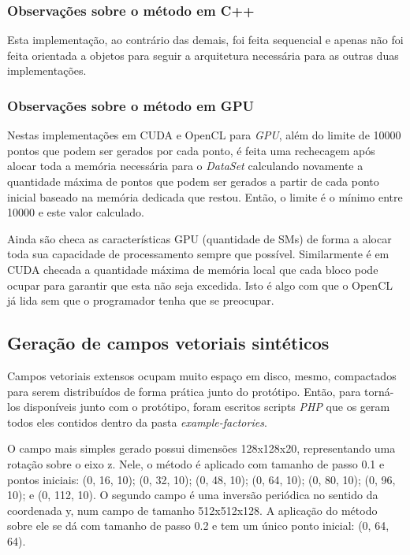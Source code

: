     \subsubsection{Observações sobre o método em C++}
    Esta implementação, ao contrário das demais, foi feita sequencial e apenas não foi feita orientada a objetos para seguir a arquitetura necessária para as outras duas implementações.
    
    \subsubsection{Observações sobre o método em GPU}
    Nestas implementações em CUDA e OpenCL para \textit{GPU}, além do limite de 10000 pontos que podem ser gerados por cada ponto, é feita uma rechecagem após alocar toda a memória necessária para o \textit{DataSet} calculando novamente a quantidade máxima de pontos que podem ser gerados a partir de cada ponto inicial baseado na memória dedicada que restou. Então, o limite é o mínimo entre 10000 e este valor calculado.

    Ainda são checa as características GPU (quantidade de SMs) de forma a alocar toda sua capacidade de processamento sempre que possível. Similarmente é em CUDA checada a quantidade máxima de memória local que cada bloco pode ocupar para garantir que esta não seja excedida. Isto é algo com que o OpenCL já lida sem que o programador tenha que se preocupar.
     
  \subsection{Geração de campos vetoriais sintéticos}
  Campos vetoriais extensos ocupam muito espaço em disco, mesmo, compactados para serem distribuídos de forma prática junto do protótipo. Então, para torná-los disponíveis junto com o protótipo, foram escritos scripts \textit{PHP} que os geram todos eles contidos dentro da pasta \textit{example-factories}.
  
  O campo mais simples gerado possui dimensões 128x128x20, representando uma rotação sobre o eixo z. Nele, o método é aplicado com tamanho de passo 0.1 e pontos iniciais: (0, 16, 10); (0, 32, 10); (0, 48, 10); (0, 64, 10); (0, 80, 10); (0, 96, 10); e  (0, 112, 10). O segundo campo é uma inversão periódica no sentido da coordenada y, num campo de tamanho 512x512x128. A aplicação do método sobre ele se dá com tamanho de passo 0.2 e tem um único ponto inicial: (0, 64, 64).
  
